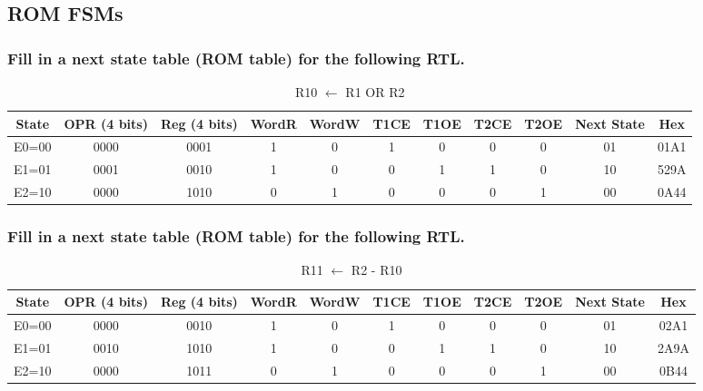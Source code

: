 \documentclass{article}
\begin{document}
	\pagebreak
	
	\subsection{ROM FSMs}
	
		\subsubsection{Fill in a next state table (ROM table) for the following RTL.}
		\begin{table}[!h]
			\centering
			\caption{R10 $\leftarrow$ R1 OR R2}
			\vspace{0.2cm}
			\begin{tabular}{|c|c|c|c|c|c|c|c|c|c|c|}
				\hline
				State & OPR (4 bits) & Reg (4 bits) & WordR & WordW & T1CE & T1OE & T2CE & T2OE & Next State & Hex\\
				\hline\hline
				E0=00 & 0000 & 0001 & 1 & 0 & 1 & 0 & 0 & 0 & 01 & 01A1\\
				\hline
				E1=01 & 0001 & 0010 & 1 & 0 & 0 & 1 & 1 & 0 & 10 & 529A\\
				\hline
				E2=10 & 0000 & 1010 & 0 & 1 & 0 & 0 & 0 & 1 & 00 & 0A44\\
				\hline
			\end{tabular}
		\end{table}		

		\subsubsection{Fill in a next state table (ROM table) for the following RTL.}
		\begin{table}[h]
			\centering
			\caption{R11 $\leftarrow$ R2 - R10}
			\vspace{0.2cm}
			\begin{tabular}{|c|c|c|c|c|c|c|c|c|c|c|}
				\hline
				State & OPR (4 bits) & Reg (4 bits) & WordR & WordW & T1CE & T1OE & T2CE & T2OE & Next State & Hex\\
				\hline\hline
				E0=00 & 0000 & 0010 & 1 & 0 & 1 & 0 & 0 & 0 & 01 & 02A1\\
				\hline
				E1=01 & 0010 & 1010 & 1 & 0 & 0 & 1 & 1 & 0 & 10 & 2A9A\\
				\hline
				E2=10 & 0000 & 1011 & 0 & 1 & 0 & 0 & 0 & 1 & 00 & 0B44\\
				\hline
			\end{tabular}
		\end{table}
\end{document}

